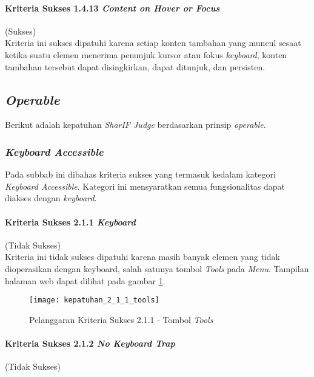 \paragraph{Kriteria Sukses 1.4.13 \textit{Content on Hover or Focus}}
\label{subsubsec:kepatuhan_kriteria_1.4.13}
(Sukses) \\

Kriteria ini sukses dipatuhi karena setiap konten tambahan yang muncul sesaat ketika suatu elemen menerima penunjuk kursor atau fokus \textit{keyboard}, konten tambahan tersebut dapat disingkirkan, dapat ditunjuk, dan persisten.

\subsection{\textit{Operable}}
\label{subsec:kepatuhan_operable}

Berikut adalah kepatuhan \textit{SharIF Judge} berdasarkan prinsip \textit{operable}.

\subsubsection{\textit{Keyboard Accessible}}
\label{subsubsec:keyboard_accessible}

Pada subbab ini dibahas kriteria sukses yang termasuk kedalam kategori \textit{Keyboard Accessible}. Kategori ini mensyaratkan semua fungsionalitas dapat diakses dengan \textit{keyboard}.

\paragraph{Kriteria Sukses 2.1.1 \textit{Keyboard}}
\label{subsubsec:kepatuhan_kriteria_2.1.1}
(Tidak Sukses) \\

Kriteria ini tidak sukses dipatuhi karena masih banyak elemen yang tidak dioperasikan dengan keyboard, salah satunya tombol \textit{Tools} pada \textit{Menu}. Tampilan halaman web dapat dilihat pada gambar \ref{fig:kepatuhan_2_1_1_tools}.
\begin{figure}[H]
	\centering  
	\texttt{[image: kepatuhan\_2\_1\_1\_tools]}  
	\caption[Pelanggaran Kriteria Sukses 2.1.1 - Tombol \textit{Tools}]{Pelanggaran Kriteria Sukses 2.1.1 - Tombol \textit{Tools}} 
	\label{fig:kepatuhan_2_1_1_tools} 
\end{figure}

\paragraph{Kriteria Sukses 2.1.2 \textit{No Keyboard Trap}}
\label{subsubsec:kepatuhan_kriteria_2.1.2}
(Tidak Sukses) \\

